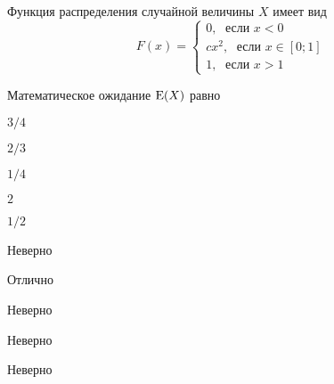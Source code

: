 
\begin{question}
Функция распределения случайной величины \(X\) имеет вид \[
F(x)=\begin{cases}
0, \; \text{ если } x<0 \\
cx^2, \; \text{ если } x\in [0;1] \\
1, \; \text{ если } x>1
\end{cases}
\]

\vspace{0.5cm}

Математическое ожидание \(\operatorname{E}(X)\) равно
\begin{answerlist}
  \item \(3/4\)
  \item \(2/3\)
  \item \(1/4\)
  \item \(2\)
  \item \(1/2\)
\end{answerlist}
\end{question}

\begin{solution}
\begin{answerlist}
  \item Неверно
  \item Отлично
  \item Неверно
  \item Неверно
  \item Неверно
\end{answerlist}
\end{solution}


